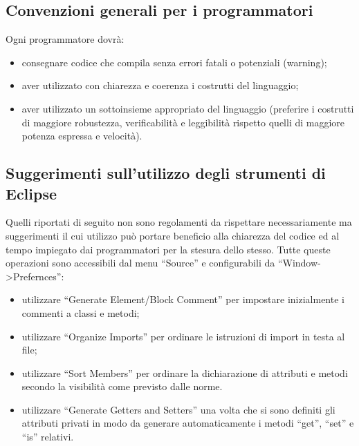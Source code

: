 \subsection{Convenzioni generali per i programmatori}
Ogni programmatore dovr\`a:
\begin{itemize}
  \item{consegnare codice che compila senza errori fatali o
potenziali (warning);} 
  \item{aver utilizzato con chiarezza e coerenza i costrutti del
linguaggio;}
  \item{aver utilizzato un sottoinsieme appropriato del linguaggio
(preferire i costrutti di maggiore robustezza, verificabilit\`a e leggibilit\`a
rispetto quelli di maggiore potenza espressa e velocit\`a).}
\end{itemize}

\subsection{Suggerimenti sull'utilizzo degli strumenti di Eclipse}
Quelli riportati di seguito non sono regolamenti da rispettare necessariamente
ma suggerimenti il cui utilizzo pu\`o portare beneficio alla chiarezza del
codice ed al tempo impiegato dai programmatori per la stesura dello stesso.
Tutte queste operazioni sono accessibili dal menu ``Source'' e configurabili da
``Window->Prefernces'':
\begin{itemize}
  \item utilizzare ``Generate Element/Block Comment'' per impostare inizialmente
  i commenti a classi e metodi;
  \item utilizzare ``Organize Imports'' per ordinare le istruzioni di import in
  testa al file;
  \item utilizzare ``Sort Members'' per ordinare la dichiarazione di attributi e
  metodi secondo la visibilit\`a come previsto dalle norme.
  \item utilizzare ``Generate Getters and Setters'' una volta che si sono
  definiti gli attributi privati in modo da generare automaticamente i metodi
  ``get'', ``set'' e ``is'' relativi.
\end{itemize}

